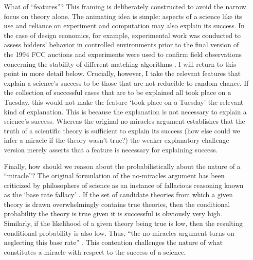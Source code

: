 What of ``features''? This framing is deliberately constructed to avoid the narrow focus on theory alone. The animating idea is simple: aspects of a science like its use and reliance on experiment and computation may also explain its success. In the case of design economics, for example, experimental work was conducted to assess bidders' behavior in controlled environments prior to the final version of the 1994 FCC auctions \autocite{plott1997} and experiments were used to confirm field observations concerning the stability of different matching algorithms \autocite{kagel2000}. I will return to this point in more detail below. Crucially, however, I take the relevant features that explain a science's success to be those that are not reducible to random chance. If the collection of successful cases that are to be explained all took place on a Tuesday, this would not make the feature `took place on a Tuesday' the relevant kind of explanation. This is because the explanation is not necessary to explain a science's success. Whereas the original no-miracles argument establishes that the truth of a scientific theory is sufficient to explain its success (how else could we infer a miracle if the theory wasn't true?) the weaker explanatory challenge version merely asserts that a feature is necessary for explaining success. 

Finally, how should we reason about the probabilistically about the nature of a ``miracle''? The original formulation of the no-miracles argument has been criticized by philosophers of science as an instance of fallacious reasoning known as the `base rate fallacy' \autocite{callender2004}. If the set of candidate theories from which a given theory is drawn overwhelmingly contains true theories, then the conditional probability the theory is true given it is successful is obviously very high. Similarly, if the likelihood of a given theory being true is low, then the resulting conditional probability is also low. Thus, ``the no-miracles argument turns on neglecting this base rate'' \autocite[326]{callender2004}. This contention challenges the nature of what constitutes a miracle with respect to the success of a science.

